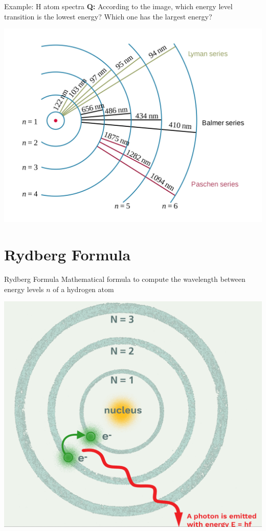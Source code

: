 \documentclass[11pt]{beamer}
\begin{document}
\begin{frame}{Example: H atom spectra}
  \textbf{Q:} According to the image, which energy level transition is
  the lowest energy? Which one has the largest energy?
  
  \begin{center}
    \includegraphics[scale=0.09]{h_spectra}
  \end{center}
\end{frame}

\section{Rydberg Formula}

\begin{frame}{Rydberg Formula}
  Mathematical formula to compute the wavelength between energy
  levels $n$ of a hydrogen atom

  \centering
  \includegraphics[width=0.55\linewidth]{bohr_model}
\end{frame}
\end{document}
